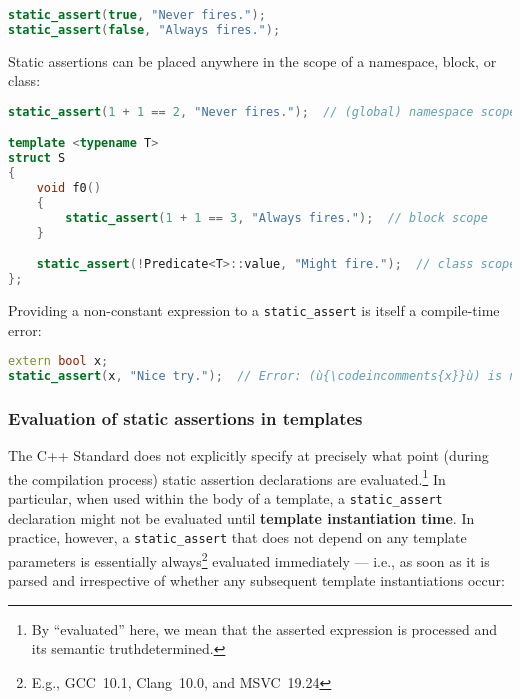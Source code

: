 \begin{lstlisting}[language=C++]
static_assert(true, "Never fires.");
static_assert(false, "Always fires.");
\end{lstlisting}
    
\noindent Static assertions can be placed anywhere in the scope of a namespace,
block, or class:

\begin{lstlisting}[language=C++]
static_assert(1 + 1 == 2, "Never fires.");  // (global) namespace scope

template <typename T>
struct S
{
    void f0()
    {
        static_assert(1 + 1 == 3, "Always fires.");  // block scope
    }

    static_assert(!Predicate<T>::value, "Might fire.");  // class scope
};
\end{lstlisting}
    
\noindent Providing a non-constant expression to a \texttt{static\_assert} is
itself a compile-time error:

\begin{lstlisting}[language=C++]
extern bool x;
static_assert(x, "Nice try.");  // Error: (ù{\codeincomments{x}}ù) is not a compile-time constant.
\end{lstlisting}
    

\subsubsection[Evaluation of static assertions in templates]{Evaluation of static assertions in templates}\label{evaluation-of-static-assertions-in-templates}

The C++ Standard does not explicitly specify at precisely what point (during
the compilation process) static assertion declarations are
evaluated.{\cprotect\footnote{By ``evaluated'' here, we mean that the
  asserted expression is processed and its semantic truth\linebreak[4] determined.}}
In particular, when used within the body of a template, a
\texttt{static\_assert} declaration might not be evaluated until
\textbf{template instantiation time}. In practice, however, a
\texttt{static\_assert} that does not depend on any template parameters
is essentially always{\cprotect\footnote{E.g.,
GCC~10.1, Clang~10.0, and MSVC~19.24}} evaluated immediately --- i.e., as
soon as it is parsed and irrespective of whether any subsequent template
instantiations occur:

